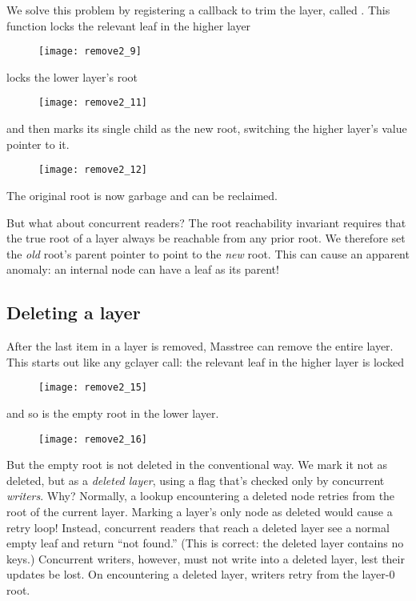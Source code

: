 \documentclass[11pt]{article}
\newcommand{\N}[1]{\text{\upshape{#1}}}
\begin{document}
We solve this problem by registering a callback to trim the layer,
called \N{gclayer}. This function locks the
relevant leaf in the higher layer

\begin{figure}[H]
\texttt{[image: remove2\_9]}
\end{figure}

\noindent%
locks the lower layer's root

\begin{figure}[H]
\texttt{[image: remove2\_11]}
\end{figure}

\noindent%
and then marks its single child as the new root, switching the higher
layer's value pointer to it.

\begin{figure}[H]
\texttt{[image: remove2\_12]}
\end{figure}

The original root is now garbage and can be reclaimed.

But what about concurrent readers? The root reachability invariant
requires that the true root of a layer always be reachable from any
prior root. We therefore set the \emph{old} root's parent pointer to
point to the \emph{new} root. This can cause an apparent anomaly: an
internal node can have a leaf as its parent!

\subsection{Deleting a layer}

After the last item in a layer is removed, Masstree can remove the
entire layer. This starts out like any gclayer call: the relevant leaf
in the higher layer is locked

\begin{figure}[H]
\texttt{[image: remove2\_15]}
\end{figure}

\noindent
and so is the empty root in the lower layer.

\begin{figure}[H]
\texttt{[image: remove2\_16]}
\end{figure}

\noindent%
But the empty root is not deleted in the conventional way. We mark it
not as deleted, but as a \emph{deleted layer}, using
a flag that's checked only by concurrent \emph{writers}. Why?
Normally, a lookup encountering a deleted node retries from the root of
the current layer. Marking a layer's only node as deleted would cause a
retry loop! Instead, concurrent readers that reach a deleted layer see a
normal empty leaf and return ``not found.'' (This is correct: the
deleted layer contains no keys.) Concurrent writers, however, must not
write into a deleted layer, lest their updates be lost. On encountering
a deleted layer, writers retry from the layer-0 root.
\end{document}
